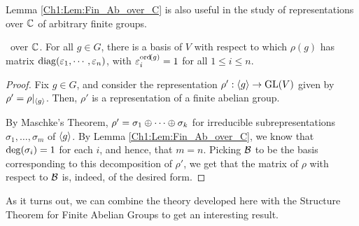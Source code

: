 Lemma \ref{Ch1:Lem:Fin_Ab_over_C} is also useful in the study of representations over $\mathbb{C}$ of arbitrary finite groups.

\begin{proposition}\label{Ch1:Prop:Diag_Roots_of_Ord}
    \ over $\mathbb{C}$. For all $g \in G$, there is a basis of $V$ with respect to which $\rho(g)$ has matrix $\operatorname{diag}\!\left( \varepsilon_1, \cdots, \varepsilon_n \right)$, with $\varepsilon_i^{\operatorname{ord}\!\left( g \right)} = 1$ for all $1 \leq i \leq n$.
\end{proposition}
\begin{proof}
    Fix $g \in G$, and consider the representation $\rho' : \left\langle g \right\rangle \to \operatorname{GL}\!\left( V \right)$ given by $\rho' = \rho\vert_{\left\langle g \right\rangle}$. Then, $\rho'$ is a representation of a finite abelian group.

    By Maschke's Theorem, $\rho' = \sigma_1 \oplus \cdots \oplus \sigma_k$ for irreducible subrepresentations $\sigma_1, \ldots, \sigma_m$ of $\left\langle g \right\rangle$. By Lemma \ref{Ch1:Lem:Fin_Ab_over_C}, we know that $\deg\!\left( \sigma_i \right) = 1$ for each $i$, and hence, that $m = n$. Picking $\mathcal{B}$ to be the basis corresponding to this decomposition of $\rho'$, we get that the matrix of $\rho$ with respect to $\mathcal{B}$ is, indeed, of the desired form.
\end{proof}

As it turns out, we can combine the theory developed here with the Structure Theorem for Finite Abelian Groups to get an interesting result.

